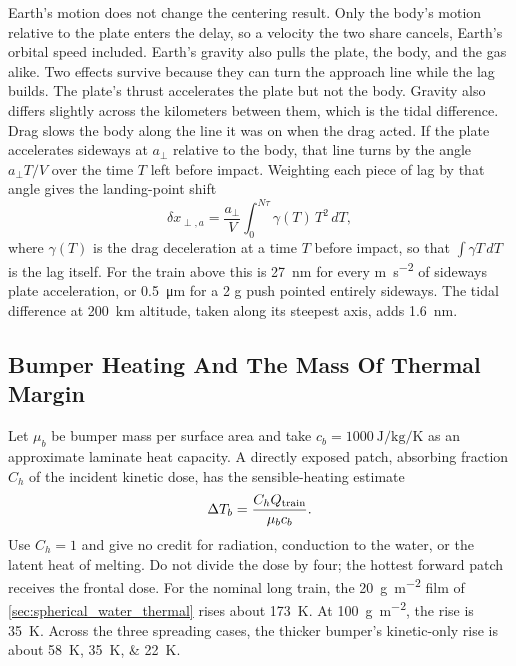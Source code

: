 \documentclass{article}
\begin{document}
Earth's motion does not change the centering result. Only the body's motion relative to the plate enters the delay, so a velocity the two share cancels, Earth's orbital speed included. Earth's gravity also pulls the plate, the body, and the gas alike. Two effects survive because they can turn the approach line while the lag builds. The plate's thrust accelerates the plate but not the body. Gravity also differs slightly across the kilometers between them, which is the tidal difference. Drag slows the body along the line it was on when the drag acted. If the plate accelerates sideways at $a_\perp$ relative to the body, that line turns by the angle $a_\perp T/V$ over the time $T$ left before impact. Weighting each piece of lag by that angle gives the landing-point shift
\begin{equation}\label{eq:plate_accel_centering}
\delta x_{\perp,a}=\frac{a_\perp}{V}\int_0^{N\tau}\gamma(T)\,T^2\,dT,
\end{equation}
where $\gamma(T)$ is the drag deceleration at a time $T$ before impact, so that $\int\gamma T\,dT$ is the lag itself. For the train above this is \SI{27}{\nano\meter} for every \si{\meter\per\second\squared} of sideways plate acceleration, or \SI{0.5}{\micro\meter} for a 2 g push pointed entirely sideways. The tidal difference at \SI{200}{\kilo\meter} altitude, taken along its steepest axis, adds \SI{1.6}{\nano\meter}.

\subsection{Bumper Heating And The Mass Of Thermal Margin}
Let $\mu_b$ be bumper mass per surface area and take $c_b=\SI{1000}{\joule\per\kilogram\per\kelvin}$ as an approximate laminate heat capacity. A directly exposed patch, absorbing fraction $C_h$ of the incident kinetic dose, has the sensible-heating estimate
\begin{equation}\label{eq:leo_bumper_heating}
\Delta T_b=\frac{C_hQ_{\rm train}}{\mu_bc_b}.
\end{equation}
Use $C_h=1$ and give no credit for radiation, conduction to the water, or the latent heat of melting. Do not divide the dose by four; the hottest forward patch receives the frontal dose. For the nominal long train, the \SI{20}{\gram\per\square\meter} film of \autoref{sec:spherical_water_thermal} rises about \SI{173}{\kelvin}. At \SI{100}{\gram\per\square\meter}, the rise is \SI{35}{\kelvin}. Across the three spreading cases, the thicker bumper's kinetic-only rise is about \SIlist{58;35;22}{\kelvin}.
\end{document}
